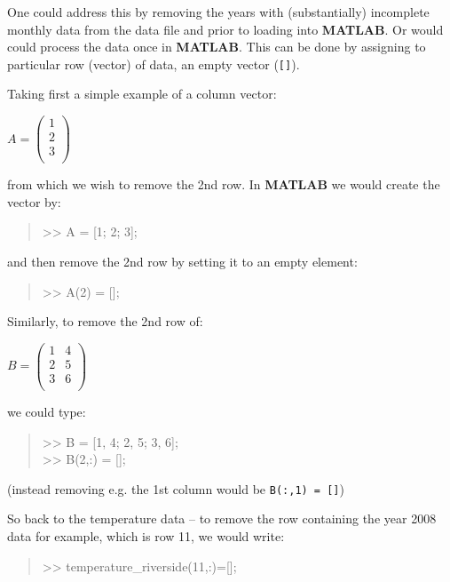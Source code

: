 \documentclass{tufte-book} %
\newenvironment{docspec}{\begin{quotation}\ttfamily\parskip0pt\parindent0pt\ignorespaces}{\end{quotation}}
\begin{document}
One could address this by removing the years with (substantially) incomplete monthly data from the data file and prior to loading into \textbf{MATLAB}. Or would could process the data once in \textbf{MATLAB}. This can be done by assigning to particular row (vector) of data, an empty vector (\texttt{[]}). 

Taking first a simple example of a column vector:

\vspace{2mm}
\(A=\begin{pmatrix}1 \\
2 \\
3 \\
\end{pmatrix}\)
\vspace{2mm}

\noindent from which we wish to remove the 2nd row. In \textbf{MATLAB} we would create the vector by:
\begin{docspec}
>> A = [1; 2; 3];
\end{docspec}
and then remove the 2nd row by setting it to an empty element:
\begin{docspec}
>> A(2) = [];
\end{docspec}

Similarly, to remove the 2nd row of:

\vspace{2mm}
\(B=\begin{pmatrix}1 & 4 \\
2 & 5 \\
3 & 6 \\
\end{pmatrix}\)
\vspace{2mm}

\noindent we could type:
\begin{docspec}
>> B = [1, 4; 2, 5; 3, 6];\\
>> B(2,:) = [];
\end{docspec}

\noindent (instead removing e.g. the 1st column would be \texttt{B(:,1) = []})

So back to the temperature data -- to remove the row containing the year 2008 data for example, which is row 11, we would write:
\begin{docspec}
>> temperature\_riverside(11,:)=[];
\end{docspec}
\end{document}
